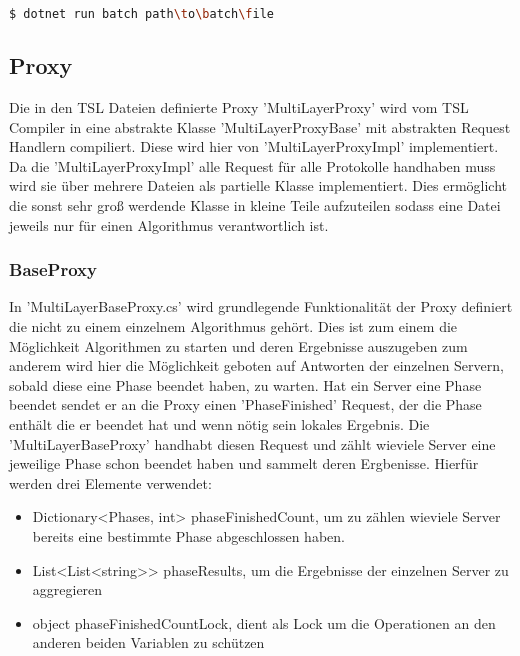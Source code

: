 \begin{lstlisting}[language=bash]
  $ dotnet run batch path\to\batch\file 
\end{lstlisting}


\subsection{Proxy}



Die in den TSL Dateien definierte Proxy 'MultiLayerProxy' wird vom TSL Compiler in eine abstrakte Klasse 'MultiLayerProxyBase' mit abstrakten Request Handlern compiliert. Diese wird hier von 'MultiLayerProxyImpl' implementiert.
Da die 'MultiLayerProxyImpl' alle Request für alle Protokolle handhaben muss wird sie über mehrere Dateien als partielle Klasse implementiert. Dies ermöglicht die sonst sehr groß werdende Klasse in kleine Teile aufzuteilen sodass eine Datei jeweils nur für einen Algorithmus verantwortlich ist.

\subsubsection{BaseProxy}

In 'MultiLayerBaseProxy.cs' wird grundlegende Funktionalität der Proxy definiert die nicht zu einem einzelnem Algorithmus gehört. Dies ist zum einem die Möglichkeit Algorithmen zu starten und deren Ergebnisse auszugeben zum anderem wird hier die Möglichkeit geboten auf Antworten der einzelnen Servern, sobald diese eine Phase beendet haben, zu warten.
Hat ein Server eine Phase beendet sendet er an die Proxy einen 'PhaseFinished' Request, der die Phase enthält die er beendet hat und wenn nötig sein lokales Ergebnis. Die 'MultiLayerBaseProxy' handhabt diesen Request und zählt wieviele Server eine jeweilige Phase schon beendet haben und sammelt deren Ergbenisse. Hierfür werden drei Elemente verwendet:

\begin{itemize}
  \item Dictionary<Phases, int> phaseFinishedCount, um zu zählen wieviele Server bereits eine bestimmte Phase abgeschlossen haben.
  \item List<List<string>> phaseResults, um die Ergebnisse der einzelnen Server zu aggregieren
  \item object phaseFinishedCountLock, dient als Lock um die Operationen an den anderen beiden Variablen zu schützen
\end{itemize}


